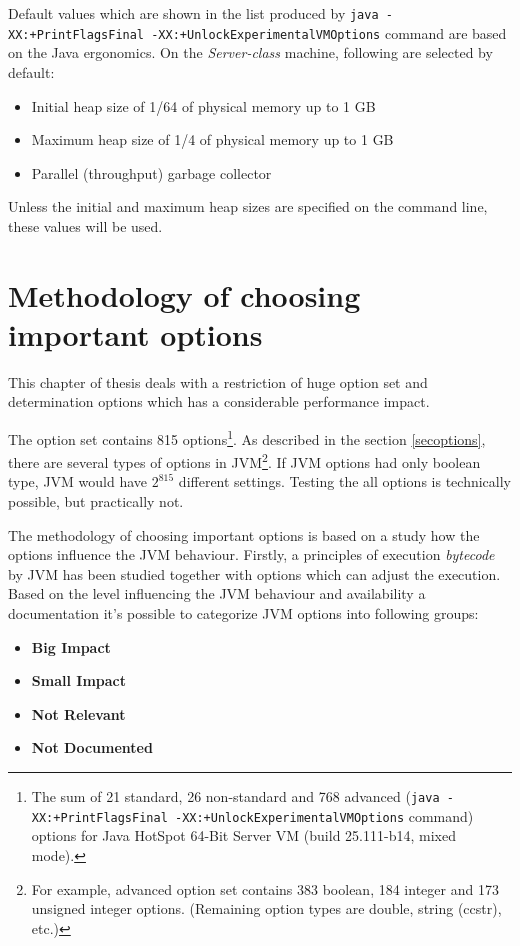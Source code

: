 \documentclass[
  digital, %
  oneside,
  notable, %
  nolof,     %
  nolot     %
]{fithesis3}
\begin{document}
Default values which are shown in the list produced by \texttt{java -XX:+PrintFlagsFinal -XX:+UnlockExperimentalVMOptions} command are based on the Java ergonomics. On the \textit{Server-class} machine, following are selected by default:
\begin{itemize}
	\item Initial heap size of 1/64 of physical memory up to 1 GB
	\item Maximum heap size of 1/4 of physical memory up to 1 GB
	\item Parallel (throughput) garbage collector
\end{itemize}
Unless the initial and maximum heap sizes are specified on the command line, these values will be used. \cite{ergonomics}


\chapter{Methodology of choosing important options}
This chapter of thesis deals with a restriction of huge option set and determination options which has a considerable performance impact.

The option set contains 815 options\footnote{The sum of 21 standard, 26 non-standard and 768 advanced (\texttt{java -XX:+PrintFlagsFinal -XX:+UnlockExperimentalVMOptions} command) options for Java HotSpot\texttrademark{} 64-Bit Server VM (build 25.111-b14, mixed mode).}. As described in the section \ref{secoptions}, there are several types of options in JVM\footnote{For example, advanced option set contains 383 boolean, 184 integer and 173 unsigned integer options. (Remaining option types are double, string (ccstr), etc.)}. If JVM options had only boolean type, JVM would have $2^{815}$ different settings. Testing the all options is technically possible, but practically not.


The methodology of choosing important options is based on a study how the options influence the JVM behaviour. Firstly, a principles of execution \textit{bytecode} by JVM has been studied together with options which can adjust the execution. Based on the level influencing the JVM behaviour and availability a documentation it's possible to categorize JVM options into following groups:
\begin{itemize}
	\item \textbf{Big Impact}
	\item \textbf{Small Impact}
	\item \textbf{Not Relevant}
	\item \textbf{Not Documented}
\end{itemize}
\end{document}
